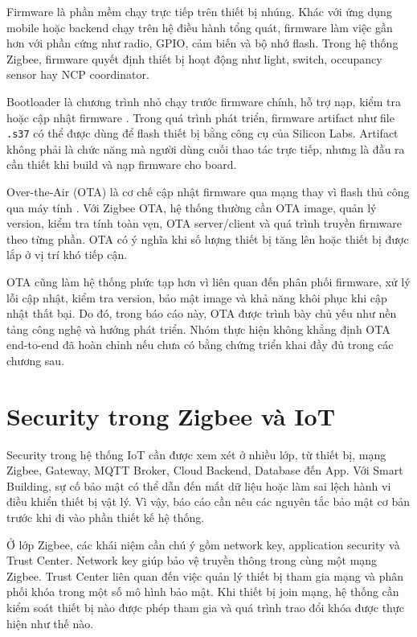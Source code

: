 Firmware là phần mềm chạy trực tiếp trên thiết bị nhúng. Khác với ứng dụng mobile hoặc backend chạy trên hệ điều hành tổng quát, firmware làm việc gần hơn với phần cứng như radio, GPIO, cảm biến và bộ nhớ flash. Trong hệ thống Zigbee, firmware quyết định thiết bị hoạt động như light, switch, occupancy sensor hay NCP coordinator.

Bootloader là chương trình nhỏ chạy trước firmware chính, hỗ trợ nạp, kiểm tra hoặc cập nhật firmware \cite{silabs-ug489}. Trong quá trình phát triển, firmware artifact như file \texttt{.s37} có thể được dùng để flash thiết bị bằng công cụ của Silicon Labs. Artifact không phải là chức năng mà người dùng cuối thao tác trực tiếp, nhưng là đầu ra cần thiết khi build và nạp firmware cho board.

Over-the-Air (OTA) là cơ chế cập nhật firmware qua mạng thay vì flash thủ công qua máy tính \cite{silabs-ota}. Với Zigbee OTA, hệ thống thường cần OTA image, quản lý version, kiểm tra tính toàn vẹn, OTA server/client và quá trình truyền firmware theo từng phần. OTA có ý nghĩa khi số lượng thiết bị tăng lên hoặc thiết bị được lắp ở vị trí khó tiếp cận.

OTA cũng làm hệ thống phức tạp hơn vì liên quan đến phân phối firmware, xử lý lỗi cập nhật, kiểm tra version, bảo mật image và khả năng khôi phục khi cập nhật thất bại. Do đó, trong báo cáo này, OTA được trình bày chủ yếu như nền tảng công nghệ và hướng phát triển. Nhóm thực hiện không khẳng định OTA end-to-end đã hoàn chỉnh nếu chưa có bằng chứng triển khai đầy đủ trong các chương sau.

\section{Security trong Zigbee và IoT}
\label{sec:ch2-security}

Security trong hệ thống IoT cần được xem xét ở nhiều lớp, từ thiết bị, mạng Zigbee, Gateway, MQTT Broker, Cloud Backend, Database đến App. Với Smart Building, sự cố bảo mật có thể dẫn đến mất dữ liệu hoặc làm sai lệch hành vi điều khiển thiết bị vật lý. Vì vậy, báo cáo cần nêu các nguyên tắc bảo mật cơ bản trước khi đi vào phần thiết kế hệ thống.

Ở lớp Zigbee, các khái niệm cần chú ý gồm network key, application security và Trust Center. Network key giúp bảo vệ truyền thông trong cùng một mạng Zigbee. Trust Center liên quan đến việc quản lý thiết bị tham gia mạng và phân phối khóa trong một số mô hình bảo mật. Khi thiết bị join mạng, hệ thống cần kiểm soát thiết bị nào được phép tham gia và quá trình trao đổi khóa được thực hiện như thế nào.

